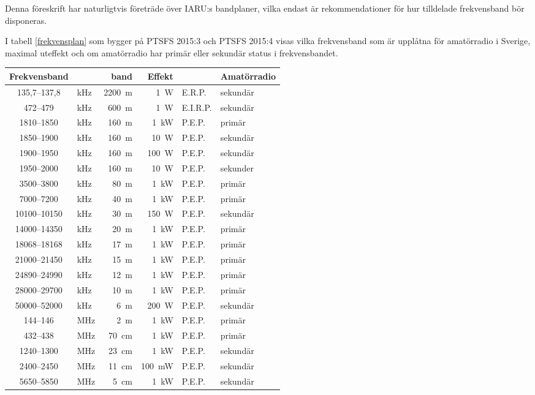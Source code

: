 Denna föreskrift har naturligtvis företräde över IARU:s bandplaner, vilka
endast är rekommendationer för hur tilldelade frekvensband bör disponeras.

I tabell \ref{frekvensplan} som bygger på PTSFS 2015:3 och PTSFS 2015:4 visas
vilka frekvensband som är upplåtna för amatörradio i Sverige, maximal uteffekt
och om amatörradio har primär eller sekundär status i frekvensbandet.

\begin{table*}[b!]
  \centering
\caption{Frekvensband för amatörradio i Sverige}
\label{frekvensplan}
\begin{tabular}{clr|rl|l}
Frekvensband &  & band & Effekt & & Amatörradio\\ \hline
135,7--137,8 & kHz & 2200~m & 1~W & E.R.P. & sekundär\\
472--479 & kHz & 600~m & 1~W & E.I.R.P. & sekundär\\
1810--1850 & kHz & 160~m & 1~kW & P.E.P. & primär\\
1850--1900 & kHz & 160~m & 10~W & P.E.P. & sekundär\\
1900--1950 & kHz & 160~m & 100~W & P.E.P. & sekundär\\
1950--2000 & kHz & 160~m & 10~W & P.E.P. & sekunder\\
3500--3800 & kHz & 80~m  & 1~kW & P.E.P. & primär\\
7000--7200 & kHz & 40~m  & 1~kW & P.E.P. & primär\\
10100--10150 & kHz & 30~m & 150~W & P.E.P. & sekundär\\
14000--14350 & kHz & 20~m & 1~kW & P.E.P. & primär\\
18068--18168 & kHz & 17~m & 1~kW & P.E.P. & primär\\
21000--21450 & kHz & 15~m & 1~kW & P.E.P. & primär\\
24890--24990 & kHz & 12~m & 1~kW & P.E.P. & primär\\
28000--29700 & kHz & 10~m & 1~kW & P.E.P. & primär\\
50000--52000 & kHz & 6~m & 200~W & P.E.P. & sekundär\\ \hline
144--146 & MHz & 2~m & 1~kW & P.E.P. & primär\\
432--438 & MHz & 70~cm & 1~kW & P.E.P. & primär\\
1240--1300 & MHz & 23~cm & 1~kW & P.E.P. & sekundär\\
2400--2450 & MHz & 11~cm & 100~mW & P.E.P. & sekundär\\
5650--5850 & MHz & 5~cm & 1~kW & P.E.P. & sekundär\\

\end{tabular}
\end{table*}
